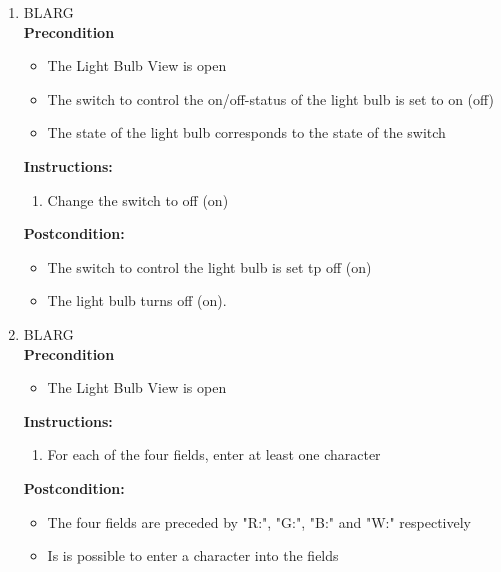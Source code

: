 \documentclass[a4paper]{article}
\newlength{\testlabellength}
\newenvironment{testlist}{\begin{enumerate}[label=\bfseries Instruction \thesubsection.\arabic* , labelindent=0pt, labelwidth=\testlabellength , leftmargin=2cm]}{\end{enumerate}}
\newenvironment{precondition}{
{\color{white}BLARG}\\ 
\textbf{Precondition}
\begin{itemize}[labelindent=0cm, labelwidth=2cm , leftmargin=1cm]
}
{\end{itemize}}
\newenvironment{instruction}{
\textbf{Instructions:}
\begin{enumerate}[label=\bfseries  \arabic*., labelindent=0cm, labelwidth=2cm , leftmargin=1cm]
}
{\end{enumerate}}
\newenvironment{postcondition}{
\textbf{Postcondition:}
\begin{itemize}[labelindent=0cm, labelwidth=2cm , leftmargin=1cm]
}
{\end{itemize}}
\begin{document}
\begin{appendices}
\begin{testlist}
	
	\item
		\begin{precondition}
			\item The Light Bulb View is open
			\item The switch to control the on/off-status of the light bulb is set to on (off)
			\item The state of the light bulb corresponds to the state of the switch
		\end{precondition}
    	\begin{instruction}
    		\item Change the switch to off (on)
    	\end{instruction}
    	\begin{postcondition}
    		\item The switch to control the light bulb is set tp off (on)
    		\item The light bulb turns off (on).
    	\end{postcondition}
    		
  
    
   	\item
   		\begin{precondition}
   			\item The Light Bulb View is open
		\end{precondition}
    	\begin{instruction}
    		\item For each of the four fields, enter at least one character
    	\end{instruction}
    	\begin{postcondition}
    		\item The four fields are preceded by "R:", "G:", "B:" and "W:" respectively
    		\item Is is possible to enter a character into the fields
    	\end{postcondition}

	

\end{testlist}
\end{appendices}
\end{document}
